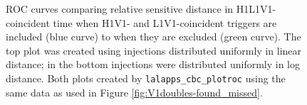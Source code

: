 \begin{figure}[p]
\center
{}
\label{fig:V1doubles-roc}
\caption{ROC curves comparing relative sensitive distance in H1L1V1-coincident
time when H1V1- and L1V1-coincident triggers are included (blue curve) to when
they are excluded (green curve). The top plot was created using injections
distributed uniformly in linear distance; in the bottom injections were
distributed uniformly in log distance. Both plots created by
\texttt{lalapps\_cbc\_plotroc} using the same data as used in Figure
\ref{fig:V1doubles-found_missed}.}
\end{figure}


